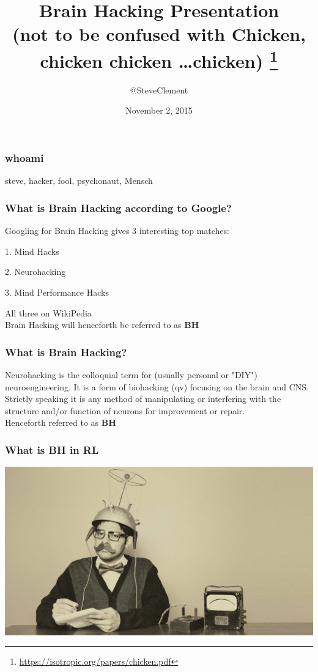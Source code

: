 \documentclass[a4paper]{beamer}
\begin{document}
\title{Brain Hacking Presentation\\(not to be confused with Chicken, chicken chicken \ldots  chicken) \footnote{\url{https://isotropic.org/papers/chicken.pdf}}}
\author{@SteveClement}
\date{November 2, 2015}


\frame{\titlepage}

\begin{frame}
\frametitle{whoami}
steve, hacker, fool, psychonaut, Mensch
\end{frame}

\begin{frame}
\frametitle{What is Brain Hacking according to Google?}

Googling for Brain Hacking gives 3 interesting top matches:

1. Mind Hacks

2. Neurohacking

3. Mind Performance Hacks

All three on WikiPedia
\\
Brain Hacking will henceforth be referred to as {\bf BH}
\end{frame}

\begin{frame}
\frametitle{What is Brain Hacking?}
Neurohacking is the colloquial term for (usually personal or "DIY") neuroengineering. It is a form of biohacking (qv) focusing on the brain and CNS. Strictly speaking it is any method of manipulating or interfering with the structure and/or function of neurons for improvement or repair.
\\
Henceforth referred to as {\bf BH}
\end{frame}

\begin{frame}
\frametitle{What is BH in RL}
\begin{center}
\includegraphics[scale=0.20]{img/mindreader3.jpg}
\end{center}
\end{frame}
\end{document}
